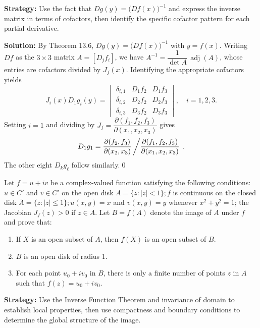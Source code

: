 \noindent\textbf{Strategy:} Use the fact that $Dg(y)=\big(Df(x)\big)^{-1}$ and express the inverse matrix in terms of cofactors, then identify the specific cofactor pattern for each partial derivative.

\bigskip\noindent\textbf{Solution:}
By Theorem 13.6, $Dg(y)=\big(Df(x)\big)^{-1}$ with $y=f(x)$. Writing $Df$ as the $3\times3$ matrix $A=[D_j f_i]$, we have $A^{-1}=\dfrac{1}{\det A}\,\operatorname{adj}(A)$, whose entries are cofactors divided by $J_f(x)$. Identifying the appropriate cofactors yields
\[J_i(x)D_1g_i(y)=\begin{vmatrix}
\delta_{i,1} & D_1f_2 & D_1f_3\\
\delta_{i,2} & D_2f_2 & D_2f_3\\
\delta_{i,3} & D_3f_2 & D_3f_3
\end{vmatrix},\quad i=1,2,3.
\]
Setting $i=1$ and dividing by $J_f=\dfrac{\partial(f_1,f_2,f_3)}{\partial(x_1,x_2,x_3)}$ gives
\[D_1g_1=\frac{\partial(f_2,f_3)}{\partial(x_2,x_3)}\left/\frac{\partial(f_1,f_2,f_3)}{\partial(x_1,x_2,x_3)}\right.\,.
\]
The other eight $D_k g_\ell$ follow similarly.\qed


\begin{problembox}
Let \( f = u + iv \) be a complex-valued function satisfying the following conditions: \( u \in C' \) and \( v \in C' \) on the open disk \( A = \{z : |z| < 1\}; f \) is continuous on the closed disk \( \bar{A} = \{z : |z| \leq 1\}; u(x, y) = x \) and \( v(x, y) = y \) whenever \( x^2 + y^2 = 1 \); the Jacobian \( J_f(z) > 0 \) if \( z \in A \). Let \( B = f(A) \) denote the image of \( A \) under \( f \) and prove that:
\begin{enumerate}[label=(\alph*)]
    \item If \( X \) is an open subset of \( A \), then \( f(X) \) is an open subset of \( B \).
    \item \( B \) is an open disk of radius 1.
    \item For each point \( u_0 + iv_0 \) in \( B \), there is only a finite number of points \( z \) in \( A \) such that \( f(z) = u_0 + iv_0 \).
\end{enumerate}
\end{problembox}

\noindent\textbf{Strategy:} Use the Inverse Function Theorem and invariance of domain to establish local properties, then use compactness and boundary conditions to determine the global structure of the image.

